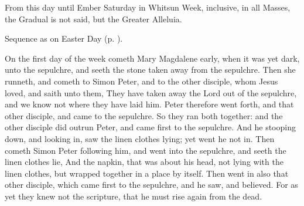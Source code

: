 \begin{rubric}
	From this day until Ember Saturday in Whitsun Week, inclusive, in all Masses, the Gradual is not said, but the Greater Alleluia. 
\end{rubric}


\begin{rubric}
    Sequence as on Easter Day (p. \pageref{PaschalSequence}).
\end{rubric}

\vspace{-0.8\baselineskip}


\vspace{-0.2\baselineskip}

 On the first day of the week cometh Mary Magdalene early, when it was yet dark, unto the sepulchre, and seeth the stone taken away from the sepulchre. Then she runneth, and cometh to Simon Peter, and to the other disciple, whom Jesus loved, and saith unto them, They have taken away the Lord out of the sepulchre, and we know not where they have laid him. Peter therefore went forth, and that other disciple, and came to the sepulchre. So they ran both together: and the other disciple did outrun Peter, and came first to the sepulchre. And he stooping down, and looking in, saw the linen clothes lying; yet went he not in. Then cometh Simon Peter following him, and went into the sepulchre, and seeth the linen clothes lie, And the napkin, that was about his head, not lying with the linen clothes, but wrapped together in a place by itself. Then went in also that other disciple, which came first to the sepulchre, and he saw, and believed. For as yet they knew not the scripture, that he must rise again from the dead.


\vspace{-0.4\baselineskip}

\secret

\vspace{-0.1\baselineskip}

